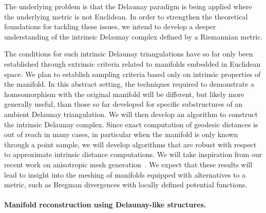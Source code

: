 The underlying problem is that the Delaunay paradigm is being applied
where the underlying metric is not Euclidean.  In order to strengthen
the theoretical foundations for tackling these issues, we intend to
develop a deeper understanding of the intrinsic Delaunay complex
defined by a Riemannian metric.
%

The conditions for such intrinsic Delaunay triangulations have so far
only been established through extrinsic criteria related to manifolds
embedded in Euclidean space. We plan to establish sampling criteria
based only on intrinsic properties of the manifold. In this abstract
setting, the techniques required to demonstrate a homeomorphism with
the original manifold will be different, but likely more generally
useful, than those so far developed for specific substructures of an
ambient Delaunay triangulation.  We will then develop an algorithm to
construct the intrinsic Delaunay complex.  Since exact computation of
geodesic distances is out of reach in many cases, in particular when
the manifold is only known through a point sample, we will develop
algorithms that are robust with respect to approximate intrinsic
distance computations. We will take inspiration from our recent work
on anisotropic mesh generation~\cite{bwy-luam-08}.
We expect that these results will lead to insight into the meshing of
manifolds equipped with alternatives to a metric, such as Bregman
divergences with locally defined potential functions.

\paragraph{Manifold reconstruction using Delaunay-like structures.}

